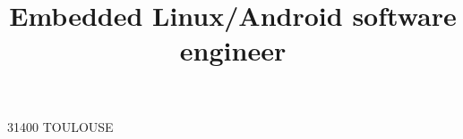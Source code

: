 \title{\large{Embedded Linux/Android software engineer}}
\address{Appt B243 Résidence Clos des Arts\\21 Chemin de la Pélude\\}{31400 TOULOUSE}
